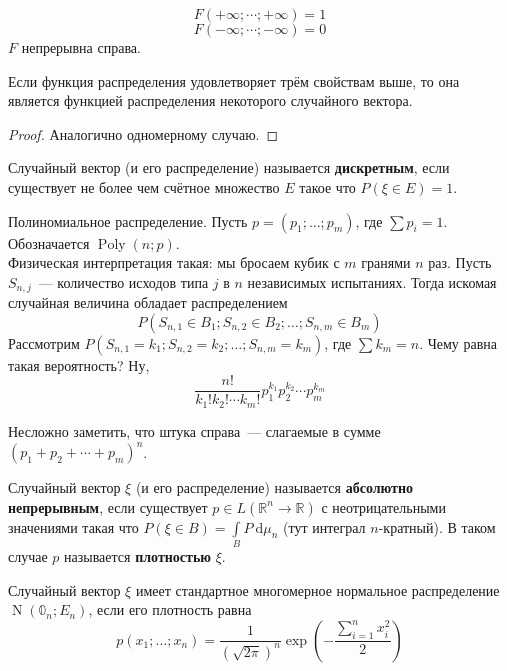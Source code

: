 \documentclass{article}
\begin{document}
    \begin{property}
        $$F(+\infty;\cdots;+\infty)=1$$
        $$F(-\infty;\cdots;-\infty)=0$$
        $F$ непрерывна справа.
    \end{property}
    \begin{theorem}
        Если функция распределения удовлетворяет трём свойствам выше, то она является функцией распределения некоторого случайного вектора.
    \end{theorem}
    \begin{proof}
        Аналогично одномерному случаю.
    \end{proof}
    \begin{definition}
        Случайный вектор (и его распределение) называется \textbf{дискретным}, если существует не более чем счётное множество $E$ такое что $P(\xi\in E)=1$.
    \end{definition}
    \begin{example}
        Полиномиальное распределение. Пусть $p=(p_1;\ldots;p_m)$, где $\sum p_i=1$. Обозначается $\operatorname{Poly}(n;p)$.\\
        Физическая интерпретация такая: мы бросаем кубик с $m$ гранями $n$ раз. Пусть $S_{n,j}$~--- количество исходов типа $j$ в $n$ независимых испытаниях. Тогда искомая случайная величина обладает распределением
        $$
        P(S_{n,1}\in B_1;S_{n,2}\in B_2;\ldots;S_{n,m}\in B_m)
        $$
        Рассмотрим $P(S_{n,1}=k_1;S_{n,2}=k_2;\ldots;S_{n,m}=k_m)$, где $\sum k_m=n$. Чему равна такая вероятность? Ну,
        $$
        \frac{n!}{k_1!k_2!\cdots k_m!}p_1^{k_1}p_2^{k_2}\cdots p_m^{k_m}
        $$
    \end{example}
    \begin{remark}
        Несложно заметить, что штука справа~--- слагаемые в сумме $(p_1+p_2+\cdots+p_m)^n$.
    \end{remark}
    \begin{definition}
        Случайный вектор $\xi$ (и его распределение) называется \textbf{абсолютно непрерывным}, если существует $p\in L(\mathbb R^n\to\mathbb R)$ с неотрицательными значениями такая что $P(\xi\in B)=\int\limits_BP~\mathrm d\mu_n$ (тут интеграл $n$-кратный). В таком случае $p$ называется \textbf{плотностью} $\xi$.
    \end{definition}
    \begin{example}
        Случайный вектор $\xi$ имеет стандартное многомерное нормальное распределение $\operatorname{N}(\mathbb0_n;E_n)$, если его плотность равна
        $$
        p(x_1;\ldots;x_n)=\frac1{(\sqrt{2\pi})^n}\exp\left(-\frac{\sum\limits_{i=1}^nx_i^2}2\right)
        $$
    \end{example}
\end{document}
